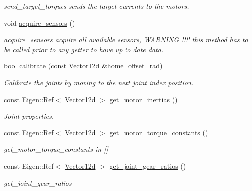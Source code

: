 \begin{DoxyCompactItemize}
\begin{DoxyCompactList}\small\item\em send\+\_\+target\+\_\+torques sends the target currents to the motors. \end{DoxyCompactList}\item 
void \hyperlink{classblmc__robots_1_1Solo12_aad9581cdcb139a49dbfb4673f18f7968}{acquire\+\_\+sensors} ()
\begin{DoxyCompactList}\small\item\em acquire\+\_\+sensors acquire all available sensors, W\+A\+R\+N\+I\+NG !!!! this method has to be called prior to any getter to have up to date data. \end{DoxyCompactList}\item 
bool \hyperlink{classblmc__robots_1_1Solo12_a8b9bfe0950a5d54ea5528aa98204f651}{calibrate} (const \hyperlink{common__header_8hpp_a80313eb420184518596e745eecf4b494}{Vector12d} \&home\+\_\+offset\+\_\+rad)
\begin{DoxyCompactList}\small\item\em Calibrate the joints by moving to the next joint index position. \end{DoxyCompactList}\item 
const Eigen\+::\+Ref$<$ \hyperlink{common__header_8hpp_a80313eb420184518596e745eecf4b494}{Vector12d} $>$ \hyperlink{classblmc__robots_1_1Solo12_a9ce8856916fb841f127be1920d18fea9}{get\+\_\+motor\+\_\+inertias} ()
\begin{DoxyCompactList}\small\item\em Joint properties. \end{DoxyCompactList}\item 
const Eigen\+::\+Ref$<$ \hyperlink{common__header_8hpp_a80313eb420184518596e745eecf4b494}{Vector12d} $>$ \hyperlink{classblmc__robots_1_1Solo12_a2135c79bff566dc0f8bace78bcf0b714}{get\+\_\+motor\+\_\+torque\+\_\+constants} ()
\begin{DoxyCompactList}\small\item\em get\+\_\+motor\+\_\+torque\+\_\+constants in \mbox{[}\mbox{]} \end{DoxyCompactList}\item 
const Eigen\+::\+Ref$<$ \hyperlink{common__header_8hpp_a80313eb420184518596e745eecf4b494}{Vector12d} $>$ \hyperlink{classblmc__robots_1_1Solo12_ab24a09564c336625a945523a74f91112}{get\+\_\+joint\+\_\+gear\+\_\+ratios} ()
\begin{DoxyCompactList}\small\item\em get\+\_\+joint\+\_\+gear\+\_\+ratios \end{DoxyCompactList}\item 

\end{DoxyCompactItemize}
